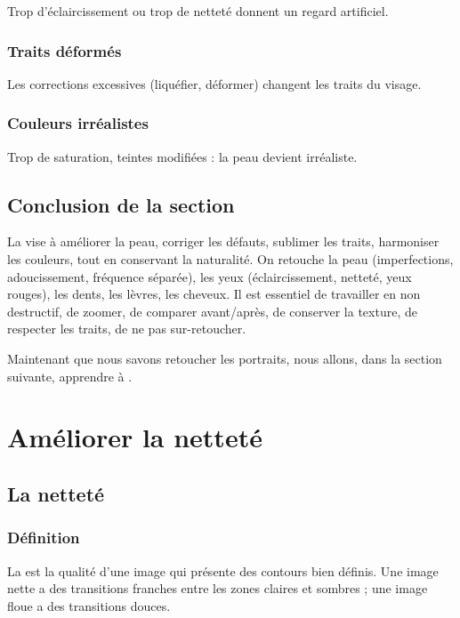Trop d'éclaircissement ou trop de netteté donnent un regard artificiel.

\subsubsection{Traits déformés}

Les corrections excessives (liquéfier, déformer) changent les traits du visage.

\subsubsection{Couleurs irréalistes}

Trop de saturation, teintes modifiées : la peau devient irréaliste.

\subsection*{Conclusion de la section}

La  vise à améliorer la peau, corriger les défauts, sublimer les traits, harmoniser les couleurs, tout en conservant la naturalité. On retouche la peau (imperfections, adoucissement, fréquence séparée), les yeux (éclaircissement, netteté, yeux rouges), les dents, les lèvres, les cheveux. Il est essentiel de travailler en non destructif, de zoomer, de comparer avant/après, de conserver la texture, de respecter les traits, de ne pas sur-retoucher.

Maintenant que nous savons retoucher les portraits, nous allons, dans la section suivante, apprendre à .

\section{Améliorer la netteté}

\subsection{La netteté}

\subsubsection{Définition}

La  est la qualité d'une image qui présente des contours bien définis. Une image nette a des transitions franches entre les zones claires et sombres ; une image floue a des transitions douces.

